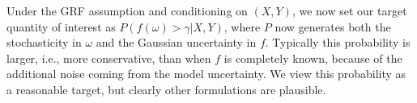 \documentclass{wscpaperproc}
\theoremstyle{wsc}
\begin{document}


Under the GRF assumption and conditioning on $(X,Y)$, we now set our target quantity of interest as $P(f(\omega)>\gamma|X,Y)$, where $P$ now generates both the stochasticity in $\omega$ and the Gaussian uncertainty in $f$. Typically this probability is larger, i.e., more conservative, than when $f$ is completely known, because of the additional noise coming from the model uncertainty. We view this probability as a reasonable target, but clearly other formulations are plausible.
\end{document}
